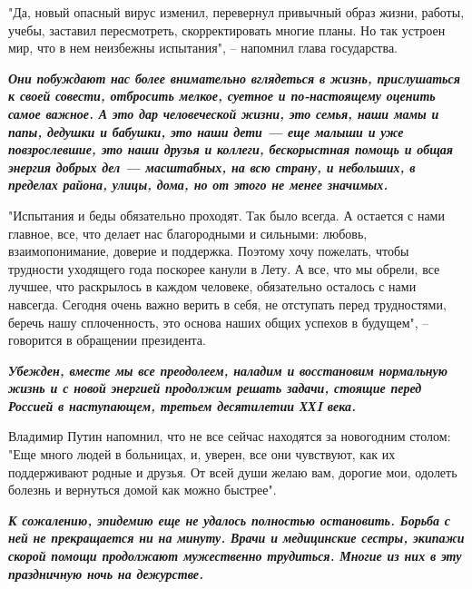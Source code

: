 "Да, новый опасный вирус изменил, перевернул привычный образ жизни, работы,
учебы, заставил пересмотреть, скорректировать многие планы. Но так устроен мир,
что в нем неизбежны испытания", – напомнил глава государства.

\begin{leftbar}
  \begingroup
    \em\Large\bfseries\color{blue}
Они побуждают нас более внимательно вглядеться в жизнь, прислушаться к своей
совести, отбросить мелкое, суетное и по-настоящему оценить самое важное. А это
дар человеческой жизни, это семья, наши мамы и папы, дедушки и бабушки, это
наши дети — еще малыши и уже повзрослевшие, это наши друзья и коллеги,
бескорыстная помощь и общая энергия добрых дел — масштабных, на всю страну, и
небольших, в пределах района, улицы, дома, но от этого не менее значимых.
  \endgroup
\end{leftbar}

"Испытания и беды обязательно проходят. Так было всегда. А остается с нами
главное, все, что делает нас благородными и сильными: любовь, взаимопонимание,
доверие и поддержка. Поэтому хочу пожелать, чтобы трудности уходящего года
поскорее канули в Лету. А все, что мы обрели, все лучшее, что раскрылось в
каждом человеке, обязательно осталось с нами навсегда. Сегодня очень важно
верить в себя, не отступать перед трудностями, беречь нашу сплоченность, это
основа наших общих успехов в будущем", – говорится в обращении президента.

\begin{leftbar}
  \begingroup
    \em\Large\bfseries\color{blue}
Убежден, вместе мы все преодолеем, наладим и восстановим нормальную жизнь и с
новой энергией продолжим решать задачи, стоящие перед Россией в наступающем,
третьем десятилетии ХХI века.
  \endgroup
\end{leftbar}

Владимир Путин напомнил, что не все сейчас находятся за новогодним столом: "Еще
много людей в больницах, и, уверен, все они чувствуют, как их поддерживают
родные и друзья. От всей души желаю вам, дорогие мои, одолеть болезнь и
вернуться домой как можно быстрее".

\begin{leftbar}
  \begingroup
    \em\Large\bfseries\color{blue}
К сожалению, эпидемию еще не удалось полностью остановить. Борьба с ней не
прекращается ни на минуту. Врачи и медицинские сестры, экипажи скорой помощи
продолжают мужественно трудиться. Многие из них в эту праздничную ночь на
дежурстве.
  \endgroup
\end{leftbar}

